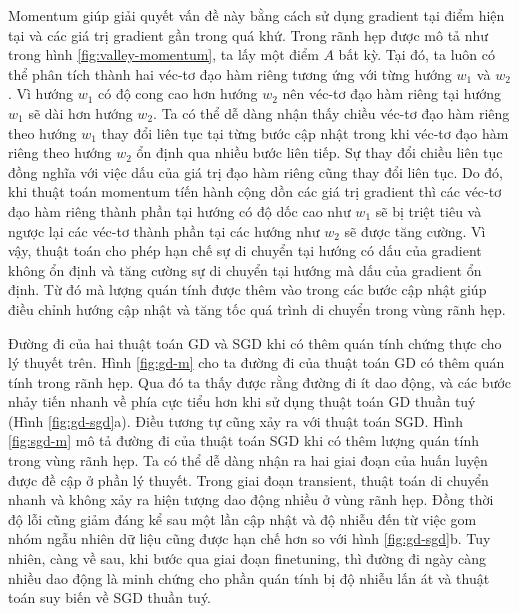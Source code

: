Momentum giúp giải quyết vấn đề này bằng cách sử dụng gradient tại điểm hiện tại và các giá trị gradient gần trong quá khứ. Trong rãnh hẹp được mô tả như trong hình \ref{fig:valley-momentum}, ta lấy một điểm $A$ bất kỳ. Tại đó, ta luôn có thể phân tích thành hai véc-tơ đạo hàm riêng tương ứng với từng hướng $w_1$ và $w_2$. Vì hướng $w_1$ có độ cong cao hơn hướng $w_2$ nên véc-tơ đạo hàm riêng tại hướng $w_1$ sẽ dài hơn hướng $w_2$. Ta có thể dễ dàng nhận thấy chiều véc-tơ đạo hàm riêng theo hướng $w_1$ thay đổi liên tục tại từng bước cập nhật trong khi véc-tơ đạo hàm riêng theo hướng $w_2$ ổn định qua nhiều bước liên tiếp. Sự thay đổi chiều liên tục đồng nghĩa với việc dấu của giá trị đạo hàm riêng cũng thay đổi liên tục. Do đó, khi thuật toán momentum tíến hành cộng dồn các giá trị gradient thì các véc-tơ đạo hàm riêng thành phần tại hướng có độ dốc cao như $w_1$ sẽ bị triệt tiêu và ngược lại các véc-tơ thành phần tại các hướng như $w_2$ sẽ được tăng cường. Vì vậy, thuật toán cho phép hạn chế sự di chuyển tại hướng có dấu của gradient không ổn định và tăng cường sự di chuyển tại hướng mà dấu của gradient ổn định. Từ đó mà lượng quán tính được thêm vào trong các bước cập nhật giúp điều chỉnh hướng cập nhật và tăng tốc quá trình di chuyển trong vùng rãnh hẹp.

Đường đi của hai thuật toán GD và SGD khi có thêm quán tính chứng thực cho lý thuyết trên. Hình \ref{fig:gd-m} cho ta đường đi của thuật toán GD có thêm quán tính trong rãnh hẹp. Qua đó ta thấy được rằng đường đi ít dao động, và các bước nhảy tiến nhanh về phía cực tiểu hơn khi sử dụng thuật toán GD thuần tuý (Hình \ref{fig:gd-sgd}a). Điều tương tự cũng xảy ra với thuật toán SGD. Hình \ref{fig:sgd-m} mô tả đường đi của thuật toán SGD khi có thêm lượng quán tính trong vùng rãnh hẹp. Ta có thể dễ dàng nhận ra hai giai đoạn của huấn luyện được đề cập ở phần lý thuyết. Trong giai đoạn transient, thuật toán di chuyển nhanh và không xảy ra hiện tượng dao động nhiều ở vùng rãnh hẹp. Đồng thời độ lỗi cũng giảm đáng kể sau một lần cập nhật và độ nhiễu đến từ việc gom nhóm ngẫu nhiên dữ liệu cũng được hạn chế hơn so với hình \ref{fig:gd-sgd}b. Tuy nhiên, càng về sau, khi bước qua giai đoạn finetuning, thì đường đi ngày càng nhiều dao động là minh chứng cho phần quán tính bị độ nhiễu lấn át và thuật toán suy biến về SGD thuần tuý.

